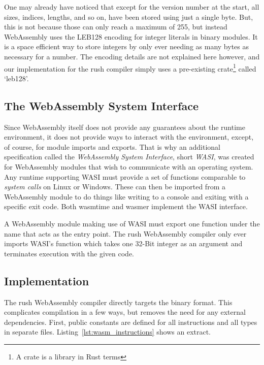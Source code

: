 One may already have noticed that except for the version number at the start, all sizes, indices, lengths, and so on, have been stored using just a single byte.
But, this is not because those can only reach a maximum of 255, but instead WebAssembly uses the LEB128 encoding for integer literals in binary modules.
It is a space efficient way to store integers by only ever needing as many bytes as necessary for a number.
The encoding details are not explained here however, and our implementation for the rush compiler simply uses a pre-existing crate\footnote{A crate is a library in Rust terms} called `leb128'.

\subsection{The WebAssembly System Interface}

Since WebAssembly itself does not provide any guarantees about the runtime environment, it does not provide ways to interact with the environment, except, of course, for module imports and exports.
That is why an additional specification called the \emph{WebAssembly System Interface}, short \emph{WASI}, was created for WebAssembly modules that wish to communicate with an operating system.
Any runtime supporting WASI must provide a set of functions comparable to \emph{system calls} on Linux or Windows.
These can then be imported from a WebAssembly module to do things like writing to a console and exiting with a specific exit code.
Both wasmtime and wasmer implement the WASI interface.

A WebAssembly module making use of WASI must export one function under the name  that acts as the entry point.
The rush WebAssembly compiler only ever imports WASI's  function which takes one 32-Bit integer as an argument and terminates execution with the given code.


\subsection{Implementation}


The rush WebAssembly compiler directly targets the binary format.
This complicates compilation in a few ways, but removes the need for any external dependencies.
First, public constants are defined for all instructions and all types in separate files.
Listing~\ref{lst:wasm_instructions} shows an extract.

